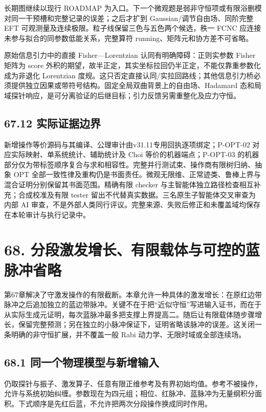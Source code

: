 \documentclass[
  11pt,
  oneside]{book}
\begin{document}
长期图继续以现行 ROADMAP
为入口。下一个微观题是弱非守恒项或有限浴删模对同一干预槽和完整记录的误差；之后才扩到
Gaussian/调节自由场、同阶完整 EFT
可观测量及连续极限。粒子线保留三色与五色两个候选，秩一 FCNC
应连接未参与拟合的同参数低能关系，完整算符
running、矩阵元和协方差不可省略。

原始信息引力中的直接 Fisher---Lorentzian 认同有明确障碍：正则实参数
Fisher 矩阵为 score
外积的期望，故半正定，其实坐标拉回仍半正定，不能仅靠重参数化成为非退化
Lorentzian
度规。这只否定直接认同/实拉回路线；其他信息引力桥必须提供独立因果或带符号结构。固定全局双曲背景上的自由场、Hadamard
态和局域探针响应，是可分离验证的后继目标；引力反馈另需重整化及应力守恒。

\section{67.12 实际证据边界}

新增操作等价源码与其编译、公理审计由v31.11专用回执逐项绑定；P-OPT-02
对应实际映射、单系统统计、辅助统计及 Choi 等价的机器端点；P-OPT-03
的机器部分仅为带标签顺序复合与求和相容性。完整并行测试束、操作商有限树归纳、抽象
OPT
全部一致性律及重构仍是书面责任。微观无限维、正常迹类、鲁棒上界与混合证明分别保留其书面范围。精确有限
checker 与主智能体独立路径检查相互补充；合成校准及有限 tester
留出不代替真实数据。三名原生子智能体交叉审查为内部 AI
审查，不是外部人类同行评议。完整来源、失败后修正和未覆盖域均保存在本轮审计与执行记录中。

\chapter{68. 分段激发增长、有限载体与可控的蓝脉冲省略}\label{ch-68}\hypertarget{ch-68}{}

第67章解决了守激发操作的有限截断。本章允许一种具体的激发增长：在原红边带脉冲之后追加独立的蓝边带脉冲。关键不在于把``近似守恒''写进输入证书，而在于从实际生成元证明，每次蓝脉冲最多把支撑上界提高二。随后让有限载体随步骤增长，保留完整预测；另在独立的小脉冲保证下，证明省略该脉冲的误差。这关闭一条明确的非守恒扩展，并不覆盖一般
Rabi 动力学、无限时域或全部连续场。

\section{68.1 同一个物理模型与新增输入}

仍取探针与振子、激发算子、任意有限正维参考及有界初始均值。参考不被操作，允许与系统初始纠缠。参数现在为四元组；相位、红脉冲、蓝脉冲为无量纲积分面积。下式顺序是先红后蓝，不允许把两次分段操作换成同时作用。
\end{document}
